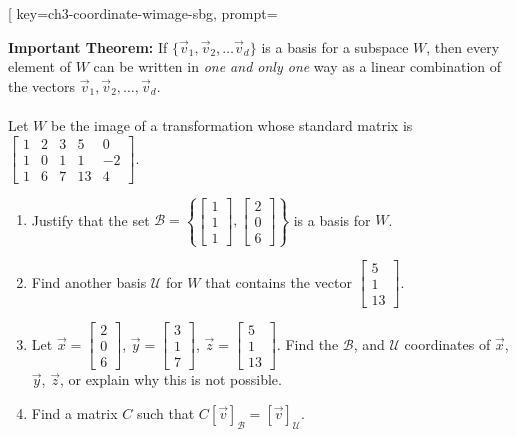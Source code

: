 \begin{SaveQuestion}[
        key=ch3-coordinate-wimage-sbg,
        prompt={\textbf{Important Theorem:}  If $\{\vec v_1, \vec v_2, \dots \vec v_d\} $  is a basis for a subspace $W$, then every element of $W$ can be written in \emph{one and only one} way as a linear combination of the vectors $\vec v_1, \vec v_2, \dots, \vec v_d$. \\ \\ Let  $W$ be the image of a transformation whose standard matrix is $\begin{bmatrix} 1 & 2 & 3 & 5 &  0\\   1& 0 & 1 & 1 & -2\\ 1 & 6 & 7 & 13 & 4 \end{bmatrix}$. \\\begin{enumerate}\item Justify that the set $\mathcal B = \left\{\begin{bmatrix} 1 \\ 1 \\ 1 \end{bmatrix}, \begin{bmatrix} 2 \\ 0 \\ 6 \end{bmatrix}\right\}$ is a basis for $W$.\item Find another basis $\mathcal U$ for $W$ that contains the vector $\begin{bmatrix} 5 \\ 1 \\ 13 \end{bmatrix}$. 
        \item Let $\vec x=\begin{bmatrix}   2 \\    0\\ 6 \end{bmatrix}$, $\vec y=\begin{bmatrix}   3 \\    1\\ 7 \end{bmatrix}$, $\vec z=\begin{bmatrix}   5\\   1\\ 13 \end{bmatrix}$. Find the $\mathcal B$, and $\mathcal U$ coordinates of $\vec x$, $\vec y$, $\vec z$, or explain why this is not possible. \item Find a matrix $C$ such that $C[\vec v]_{\mathcal B}=[\vec v]_{\mathcal U}$.

\end{enumerate}}
\end{SaveQuestion}
